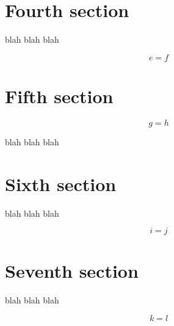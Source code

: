 \documentclass{amsart}
\begin{document}
\section{Fourth section}\label{sec:4}

blah blah blah

\begin{equation}\label{eq:3}
e = f
\end{equation}

\section{Fifth section}\label{sec:5}

\begin{equation}\label{eq:4}
g = h
\end{equation}

blah blah blah

\section{Sixth section}\label{sec:6}

blah blah blah

\begin{equation}\label{eq:5}
i = j
\end{equation}

\section{Seventh section}\label{sec:7}

blah blah blah

\begin{equation}\label{eq:6}
k = l
\end{equation}
\end{document}
